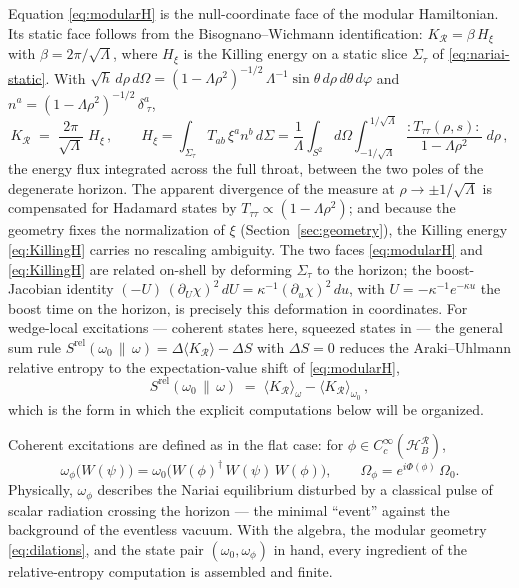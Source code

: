 \documentclass[11pt]{article}
\newcommand{\Srel}{S^{\mathrm{rel}}}
\newcommand{\Nariai}{Nariai}
\begin{document}
Equation \eqref{eq:modularH} is the null-coordinate face of the modular Hamiltonian. Its static face follows from the Bisognano--Wichmann identification: $K_{\mathcal{R}} = \beta\, H_\xi$ with $\beta = 2\pi/\sqrt{\Lambda}$, where $H_\xi$ is the Killing energy on a static slice $\Sigma_\tau$ of \eqref{eq:nariai-static}. With $\sqrt{h}\, d\rho\, d\Omega = (1-\Lambda\rho^2)^{-1/2}\, \Lambda^{-1} \sin\theta\, d\rho\, d\theta\, d\varphi$ and $n^a = (1-\Lambda\rho^2)^{-1/2}\, \delta^a_{\;\tau}$,
\begin{equation}
K_{\mathcal{R}} \;=\; \frac{2\pi}{\sqrt{\Lambda}}\; H_\xi\,,
\qquad
H_\xi
= \int_{\Sigma_\tau} T_{ab}\, \xi^a n^b\, d\Sigma
= \frac{1}{\Lambda} \int_{S^2} d\Omega \int_{-1/\sqrt{\Lambda}}^{\,1/\sqrt{\Lambda}}
\frac{{:}T_{\tau\tau}(\rho, s){:}}{1 - \Lambda \rho^2}\; d\rho\,,
\label{eq:KillingH}
\end{equation}
the energy flux integrated across the full throat, between the two poles of the degenerate horizon. The apparent divergence of the measure at $\rho \to \pm 1/\sqrt{\Lambda}$ is compensated for Hadamard states by $T_{\tau\tau} \propto (1-\Lambda\rho^2)$; and because the geometry fixes the normalization of $\xi$ (Section~\ref{sec:geometry}), the Killing energy \eqref{eq:KillingH} carries no rescaling ambiguity. The two faces \eqref{eq:modularH} and \eqref{eq:KillingH} are related on-shell by deforming $\Sigma_\tau$ to the horizon; the boost-Jacobian identity $(-U)\,(\partial_U\chi)^2\,dU = \kappa^{-1}(\partial_u\chi)^2\,du$, with $U = -\kappa^{-1}e^{-\kappa u}$ the boost time on the horizon, is precisely this deformation in coordinates. For wedge-local excitations --- coherent states here, squeezed states in \cite{SuppNariai} --- the general sum rule $\Srel(\omega_0\,\|\,\omega) = \Delta\langle K_{\mathcal{R}}\rangle - \Delta S$ with $\Delta S = 0$ reduces the Araki--Uhlmann relative entropy to the expectation-value shift of \eqref{eq:modularH},
\begin{equation}
\Srel(\omega_0\,\|\,\omega) \;=\; \langle K_{\mathcal{R}} \rangle_{\omega} - \langle K_{\mathcal{R}} \rangle_{\omega_0}\,,
\label{eq:Srel-K}
\end{equation}
which is the form in which the explicit computations below will be organized.

Coherent excitations are defined as in the flat case: for $\phi \in C_c^\infty(\mathcal{H}_B^{\mathcal{R}})$,
\begin{equation}
\omega_\phi\big(W(\psi)\big) = \omega_0\big(W(\phi)^\dagger\, W(\psi)\, W(\phi)\big),
\qquad
\Omega_\phi = e^{i\Phi(\phi)}\,\Omega_0 .
\label{eq:coherent}
\end{equation}
Physically, $\omega_\phi$ describes the \Nariai{} equilibrium disturbed by a classical pulse of scalar radiation crossing the horizon --- the minimal ``event'' against the background of the eventless vacuum. With the algebra, the modular geometry \eqref{eq:dilations}, and the state pair $(\omega_0, \omega_\phi)$ in hand, every ingredient of the relative-entropy computation is assembled and finite.
\end{document}
